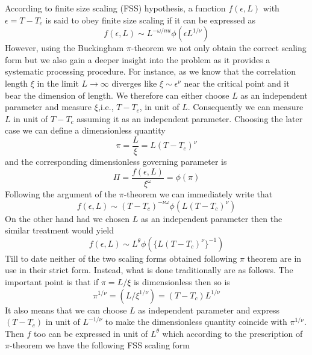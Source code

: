 	According to finite size scaling (FSS) hypothesis, a function $f(\epsilon, L)$ with $\epsilon = T-T_c$ is said to obey finite size scaling if it can be expressed as 
	\begin{equation}
		f(\epsilon, L) \sim L^{-\omega/nu} \phi(\epsilon L^{1/\nu})
		\label{fss 1}
	\end{equation}
	However, using the Buckingham $\pi$-theorem we not only obtain the correct scaling form but we also gain a deeper insight into the problem as it provides a systematic processing procedure. For instance, as we know that the correlation length $\xi$ in the limit $L \rightarrow \infty$ diverges like $\xi \sim \epsilon^\nu$ near the critical point and it bear the dimension of length. We therefore can either choose $L$ as an independent parameter and measure $\xi$,i.e., $T-T_c$, in unit of $L$. Consequently we can measure $L$ in unit of $T-T_c$ assuming it as an independent parameter. Choosing the later case we can define a dimensionless quantity
	\begin{equation}
		\pi = \frac{L}{\xi} = L(T-T_c)^\nu
	\end{equation}
	and the corresponding dimensionless governing parameter is 
	\begin{equation}
		\Pi = \frac{f(\epsilon, L)}{\xi^\omega} = \phi(\pi)
	\end{equation}
	Following the argument of the $\pi$-theorem we can immediately write that
	\begin{equation}
		f(\epsilon, L) \sim (T-T_c)^{-\nu \omega} \phi(L(T-T_c)^\nu)
	\end{equation}
	On the other hand had we chosen $L$ as an independent parameter then the similar treatment would yield
	\begin{equation}
		f(\epsilon, L)  \sim L^\theta \phi(\{L(T-T_c)^\nu\}^{-1})
	\end{equation}
	Till to date neither of the two scaling forms obtained following $\pi$ theorem are in use in their strict form. Instead, what is done traditionally are as follows. The important point is that if $\pi = L/\xi$ is dimensionless then so is 
	\begin{equation}
		\pi^{1/\nu} = (L/\xi^{1/\nu}) = (T-T_c) L^{1/\nu}
	\end{equation}
	It also means that we can choose $L$ as independent parameter and express $(T-T_c)$ in unit of $L^{-1/\nu}$ to make the dimensionless quantity coincide with $\pi^{1/\nu}$. Then $f$ too can be expressed in unit of $L^\theta$ which according to the prescription of $\pi$-theorem we have the following FSS scaling form
